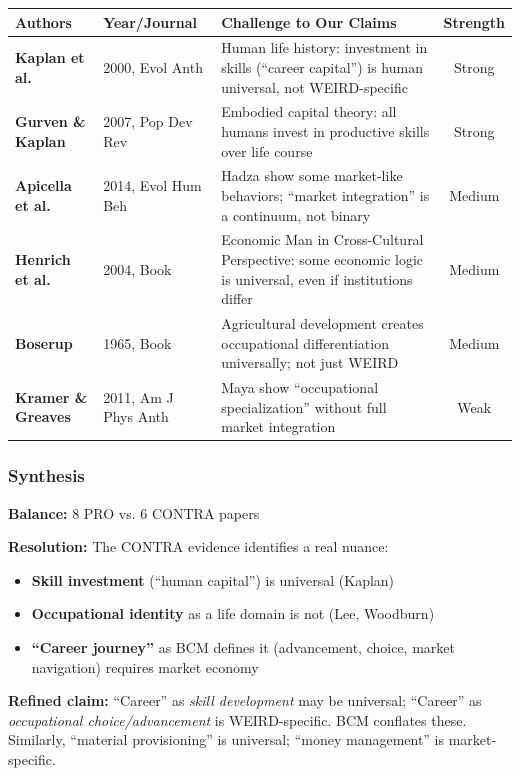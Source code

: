 \begin{center}
\scriptsize
\begin{longtable}{@{}p{3cm}p{2cm}p{6cm}c@{}}
\toprule
\textbf{Authors} & \textbf{Year/Journal} & \textbf{Challenge to Our Claims} & \textbf{Strength} \\
\midrule
\endfirsthead
\bottomrule
\endlastfoot
\textbf{Kaplan et al.} & 2000, Evol Anth & Human life history: investment in skills (``career capital'') is human universal, not WEIRD-specific & Strong \\
\textbf{Gurven \& Kaplan} & 2007, Pop Dev Rev & Embodied capital theory: all humans invest in productive skills over life course & Strong \\
\textbf{Apicella et al.} & 2014, Evol Hum Beh & Hadza show some market-like behaviors; ``market integration'' is a continuum, not binary & Medium \\
\textbf{Henrich et al.} & 2004, Book & Economic Man in Cross-Cultural Perspective: some economic logic is universal, even if institutions differ & Medium \\
\textbf{Boserup} & 1965, Book & Agricultural development creates occupational differentiation universally; not just WEIRD & Medium \\
\textbf{Kramer \& Greaves} & 2011, Am J Phys Anth & Maya show ``occupational specialization'' without full market integration & Weak \\
\end{longtable}
\end{center}

\subsubsection{Synthesis}

\begin{tcolorbox}[colback=yellow!5!white, colframe=yellow!75!black, title=Evidence Synthesis: Claim 2]

\textbf{Balance:} 8 PRO vs. 6 CONTRA papers

\textbf{Resolution:} The CONTRA evidence identifies a real nuance:
\begin{itemize}[nosep]
\item \textbf{Skill investment} (``human capital'') is universal (Kaplan)
\item \textbf{Occupational identity} as a life domain is not (Lee, Woodburn)
\item \textbf{``Career journey''} as BCM defines it (advancement, choice, market navigation) requires market economy
\end{itemize}

\textbf{Refined claim:} ``Career'' as \textit{skill development} may be universal; ``Career'' as \textit{occupational choice/advancement} is WEIRD-specific. BCM conflates these. Similarly, ``material provisioning'' is universal; ``money management'' is market-specific.

\end{tcolorbox}

